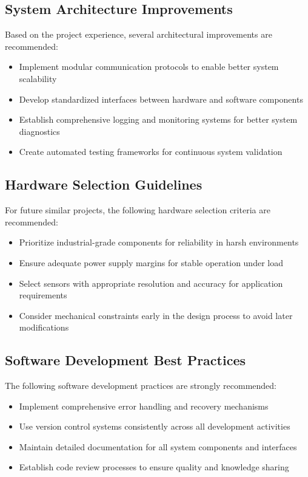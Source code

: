 \documentclass{book}
\begin{document}
\subsection{System Architecture Improvements}

\par\noindent Based on the project experience, several architectural improvements are recommended:

\begin{itemize}
\item Implement modular communication protocols to enable better system scalability
\item Develop standardized interfaces between hardware and software components
\item Establish comprehensive logging and monitoring systems for better system diagnostics
\item Create automated testing frameworks for continuous system validation
\end{itemize}

\subsection{Hardware Selection Guidelines}

\par\noindent For future similar projects, the following hardware selection criteria are recommended:

\begin{itemize}
\item Prioritize industrial-grade components for reliability in harsh environments
\item Ensure adequate power supply margins for stable operation under load
\item Select sensors with appropriate resolution and accuracy for application requirements
\item Consider mechanical constraints early in the design process to avoid later modifications
\end{itemize}

\subsection{Software Development Best Practices}

\par\noindent The following software development practices are strongly recommended:

\begin{itemize}
\item Implement comprehensive error handling and recovery mechanisms
\item Use version control systems consistently across all development activities
\item Maintain detailed documentation for all system components and interfaces
\item Establish code review processes to ensure quality and knowledge sharing
\end{itemize}
\end{document}
